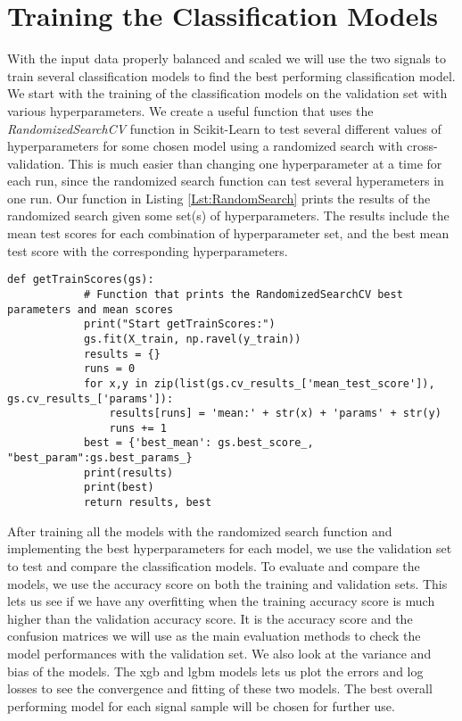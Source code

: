 \documentclass[a4paper, american, 12pt]{report}
\begin{document}
	
	\section{Training the Classification Models} 
	\label{sect:Method-Tuning}
	With the input data properly balanced and scaled we will use the two signals to train several classification models to find the best performing classification model. We start with the training of the classification models on the validation set with various hyperparameters. We create a useful function that uses the \textit{RandomizedSearchCV} function in Scikit-Learn to test several different values of hyperparameters for some chosen model using a randomized search with cross-validation. This is much easier than changing one hyperparameter at a time for each run, since the randomized search function can test several hyperameters in one run. Our function in Listing \ref{Lst:RandomSearch} prints the results of the randomized search given some set(s) of hyperparameters. The results include the mean test scores for each combination of hyperparameter set, and the best mean test score with the corresponding hyperparameters.
	\begin{lstlisting}[caption=Function for training models using a randomized search function., label=Lst:RandomSearch]
		def getTrainScores(gs):
			# Function that prints the RandomizedSearchCV best parameters and mean scores
			print("Start getTrainScores:")
			gs.fit(X_train, np.ravel(y_train))
			results = {}
			runs = 0
			for x,y in zip(list(gs.cv_results_['mean_test_score']), gs.cv_results_['params']):
				results[runs] = 'mean:' + str(x) + 'params' + str(y)
				runs += 1
			best = {'best_mean': gs.best_score_, "best_param":gs.best_params_}
			print(results)
			print(best)
			return results, best
	\end{lstlisting}
	
	After training all the models with the randomized search function and implementing the best hyperparameters for each model, we use the validation set to test and compare the classification models. To evaluate and compare the models, we use the accuracy score on both the training and validation sets. This lets us see if we have any overfitting when the training accuracy score is much higher than the validation accuracy score. It is the accuracy score and the confusion matrices we will use as the main evaluation methods to check the model performances with the validation set. We also look at the variance and bias of the models. The \acrshort{xgb} and \acrshort{lgbm} models lets us plot the errors and log losses to see the convergence and fitting of these two models. The best overall performing model for each signal sample will be chosen for further use.
	
\end{document}
